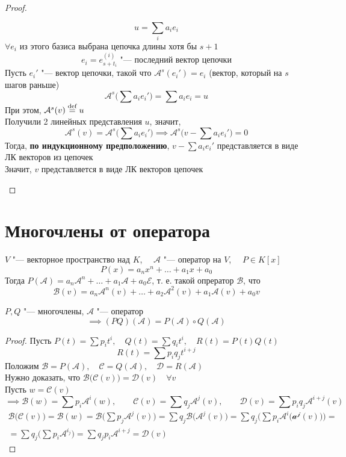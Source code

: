 \begin{proof}
\begin{itemize}
		$$ u = \sum_i a_ie_i $$
		$ \forall e_i $ из этого базиса выбрана цепочка длины хотя бы $ s + 1 $
		$$ e_i = e_{s + t_i}^{(i)} \text{ "--- последний вектор цепочки} $$
		Пусть $ e_i' $ "--- вектор цепочки, такой что $ \mathcal{A}^s(e_i') = e_i $ (вектор, который на $ s $ шагов раньше)
		$$ \mathcal{A}^s \bigg( \sum a_ie_i' \bigg) = \sum a_ie_i = u $$
		При этом, $ \mathcal{A}^s(v) \stackrel{\text{def}}{=} u $ \\
		Получили 2 линейных представления $ u $, значит,
		$$ \mathcal{A}^s(v) = \mathcal{A}^s \bigg( \sum a_ie_i' \bigg) \implies \mathcal{A}^s \bigg( v - \sum a_ie_i' \bigg) = 0 $$
		Тогда, \textbf{по индукционному предположению}, $ v - \sum a_ie_i' $ представляется в виде ЛК векторов из цепочек \\
		Значит, $ v $ представляется в виде ЛК векторов цепочек
	\end{itemize}
\end{proof}

\section{Многочлены от оператора}

\begin{notation}
	$ V $ "--- векторное пространство над $ K $, $ \quad \mathcal{A} $ "--- оператор на $ V $, $ \quad P \in K[x] $
	$$ P(x) = a_nx^n + \dots + a_1x + a_0 $$
	Тогда $ P(\mathcal{A}) = a_n\mathcal{A}^n + \dots + a_1\mathcal{A} + a_0\mathcal{E} $, т. е. такой опрератор $ \mathcal{B} $, что
	$$ \mathcal{B}(v) = a_n \mathcal{A}^n(v) + \dots + a_2\mathcal{A}^2(v) + a_1\mathcal{A}(v) + a_0v $$
\end{notation}

\begin{lemma}
	$ P, Q $ "--- многочлены, $ \mathcal{A} $ "--- оператор
	$$ \implies (PQ)(\mathcal{A}) = P(\mathcal{A}) \circ Q(\mathcal{A}) $$
\end{lemma}

\begin{proof}
	Пусть $ P(t) = \sum p_it^i, \quad Q(t) = \sum q_it^i, \quad R(t) = P(t)Q(t) $
	$$ R(t) = \sum p_iq_jt^{i + j} $$
	Положим $ \mathcal{B} = P(\mathcal{A}), \quad \mathcal{C} = Q(\mathcal{A}), \quad \mathcal{D} = R(\mathcal{A}) $ \\
	Нужно доказать, что $ \mathcal{B} \bigg( \mathcal{C}(v) \bigg) = \mathcal{D}(v) \quad \forall v $ \\
	Пусть $ w = \mathcal{C}(v) $
	$$ \implies \mathcal{B}(w) = \sum p_i \mathcal{A}^i(w), \qquad \mathcal{C}(v) = \sum q_j\mathcal{A}^j(v), \qquad \mathcal{D}(v) = \sum p_iq_j \mathcal{A}^{i + j}(v) $$
	\begin{multline*}
		\mathcal{B} \bigg( \mathcal{C}(v) \bigg) = \mathcal{B}(w) = \mathcal{B} \bigg( \sum p_j \mathcal{A}^j(v) \bigg) = \sum q_j \mathcal{B} \bigg( \mathcal{A}^j(v) \bigg) = \sum q_j \bigg( \sum p_i \mathcal{A}^i \big( \mathcal{a^j}(v) \big) \bigg) = \\
		= \sum q_j \bigg( \sum p_i \mathcal{A}^{i _ j} \bigg) = \sum q_jp_i \mathcal{A}^{i + j} = \mathcal{D}(v)
	\end{multline*}
\end{proof}

